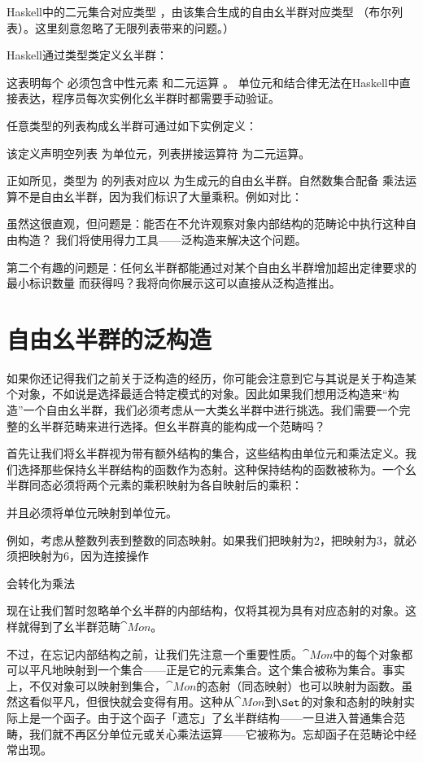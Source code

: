 Haskell中的二元集合对应类型 ，由该集合生成的自由幺半群对应类型
\code{{[}Bool{]}}（布尔列表）。这里刻意忽略了无限列表带来的问题。）

Haskell通过类型类定义幺半群：

这表明每个  必须包含中性元素  和二元运算 。
单位元和结合律无法在Haskell中直接表达，程序员每次实例化幺半群时都需要手动验证。

任意类型的列表构成幺半群可通过如下实例定义：

该定义声明空列表 \code{{[}{]}} 为单位元，列表拼接运算符 \code{(++)} 为二元运算。

正如所见，类型为  的列表对应以  为生成元的自由幺半群。自然数集合配备
乘法运算不是自由幺半群，因为我们标识了大量乘积。例如对比：

虽然这很直观，但问题是：能否在不允许观察对象内部结构的范畴论中执行这种自由构造？
我们将使用得力工具——泛构造来解决这个问题。

第二个有趣的问题是：任何幺半群都能通过对某个自由幺半群增加超出定律要求的最小标识数量
而获得吗？我将向你展示这可以直接从泛构造推出。

\section{自由幺半群的泛构造}

如果你还记得我们之前关于泛构造的经历，你可能会注意到它与其说是关于构造某个对象，不如说是选择最适合特定模式的对象。因此如果我们想用泛构造来“构造”一个自由幺半群，我们必须考虑从一大类幺半群中进行挑选。我们需要一个完整的幺半群范畴来进行选择。但幺半群真的能构成一个范畴吗？

首先让我们将幺半群视为带有额外结构的集合，这些结构由单位元和乘法定义。我们选择那些保持幺半群结构的函数作为态射。这种保持结构的函数被称为。一个幺半群同态必须将两个元素的乘积映射为各自映射后的乘积：

并且必须将单位元映射到单位元。

例如，考虑从整数列表到整数的同态映射。如果我们把\code{{[}2{]}}映射为2，把\code{{[}3{]}}映射为3，就必须把\code{{[}2, 3{]}}映射为6，因为连接操作

会转化为乘法

现在让我们暂时忽略单个幺半群的内部结构，仅将其视为具有对应态射的对象。这样就得到了幺半群范畴$\cat{Mon}$。

不过，在忘记内部结构之前，让我们先注意一个重要性质。$\cat{Mon}$中的每个对象都可以平凡地映射到一个集合——正是它的元素集合。这个集合被称为集合。事实上，不仅对象可以映射到集合，$\cat{Mon}$的态射（同态映射）也可以映射为函数。虽然这看似平凡，但很快就会变得有用。这种从$\cat{Mon}$到$\Set$的对象和态射的映射实际上是一个函子。由于这个函子「遗忘」了幺半群结构——一旦进入普通集合范畴，我们就不再区分单位元或关心乘法运算——它被称为。忘却函子在范畴论中经常出现。

